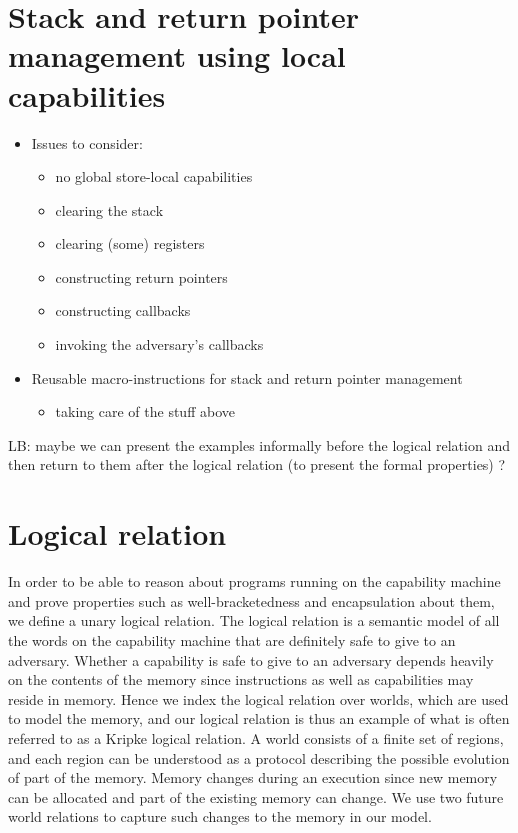 \documentclass[compsoc,conference,letterpaper,fleqn]{IEEEtran}
\begin{document}
\section{Stack and return pointer management using local capabilities}
\begin{itemize}
\item Issues to consider:
\begin{itemize}
\item no global store-local capabilities
\item clearing the stack
\item clearing (some) registers
\item constructing return pointers
\item constructing callbacks
\item invoking the adversary's callbacks
\end{itemize}
\item Reusable macro-instructions for stack and return pointer management
\begin{itemize}
\item taking care of the stuff above
\end{itemize}
\end{itemize}

LB: maybe we can present the examples informally before the logical relation and then return to them after the logical relation (to present the formal properties) ?

\section{Logical relation}
In order to be able to reason about programs running on the capability
machine and prove properties such as well-bracketedness and
encapsulation about them, we define a unary logical relation.
The logical relation is a semantic model of all the words on the
capability machine that are definitely safe to give to an
adversary. Whether a capability is safe to give to an adversary
depends heavily on the contents of the memory since instructions as well
as capabilities may reside in memory. Hence we index the logical
relation over worlds, which are used to model the memory, and our logical
relation is thus an example of what is often referred to as a Kripke
logical relation. A world consists of a finite set of regions, and each region
can be understood as a protocol describing the possible evolution of
part of the memory. Memory changes during an
execution since new memory can be allocated and part of the existing
memory can change. We use two future world relations to capture
such changes to the memory in our model.
%
\end{document}
